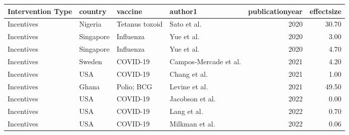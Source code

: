 
\begin{tabular}{llllrr}
\toprule
Intervention Type & country & vaccine & author1 & publicationyear & effectsize\\
\midrule
Incentives & Nigeria & Tetanus toxoid & Sato et al. & 2020 & 30.70\\
Incentives & Singapore & Influenza & Yue et al. & 2020 & 3.00\\
Incentives & Singapore & Influenza & Yue et al. & 2020 & 4.70\\
Incentives & Sweden & COVID-19 & Campos-Mercade et al. & 2021 & 4.20\\
Incentives & USA & COVID-19 & Chang et al. & 2021 & 1.00\\
\addlinespace
Incentives & Ghana & Polio; BCG & Levine et al. & 2021 & 49.50\\
Incentives & USA & COVID-19 & Jacobson et al. & 2022 & 0.00\\
Incentives & USA & COVID-19 & Lang et al. & 2022 & 0.70\\
Incentives & USA & COVID-19 & Milkman et al. & 2022 & 0.06\\
\bottomrule
\end{tabular}
